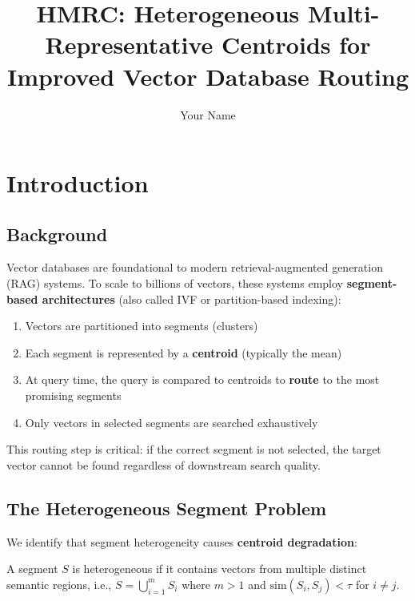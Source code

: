 \documentclass[sigconf, nonacm]{acmart}
\title{HMRC: Heterogeneous Multi-Representative Centroids for Improved Vector Database Routing}
\author{Your Name}
\affiliation{
  \institution{Your Institution}
  \city{Your City}
  \country{Your Country}
}
\begin{document}
\maketitle


\section{Introduction}

\subsection{Background}

Vector databases are foundational to modern retrieval-augmented generation (RAG) systems. To scale to billions of vectors, these systems employ \textbf{segment-based architectures} (also called IVF or partition-based indexing):

\begin{enumerate}
    \item Vectors are partitioned into segments (clusters)
    \item Each segment is represented by a \textbf{centroid} (typically the mean)
    \item At query time, the query is compared to centroids to \textbf{route} to the most promising segments
    \item Only vectors in selected segments are searched exhaustively
\end{enumerate}

This routing step is critical: if the correct segment is not selected, the target vector cannot be found regardless of downstream search quality.

\subsection{The Heterogeneous Segment Problem}

We identify that segment heterogeneity causes \textbf{centroid degradation}:

\begin{definition}
A segment $S$ is heterogeneous if it contains vectors from multiple distinct semantic regions, i.e., $S = \bigcup_{i=1}^{m} S_i$ where $m > 1$ and $\text{sim}(S_i, S_j) < \tau$ for $i \neq j$.
\end{definition}
\end{document}
